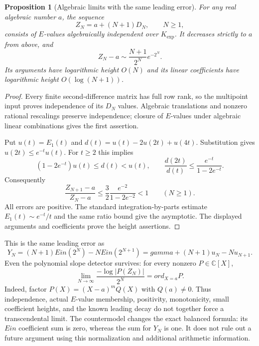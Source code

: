 \documentclass[11pt,a4paper]{article}
\DeclareMathOperator{\Ein}{Ein}
\newtheorem{proposition}[theorem]{Proposition}
\theoremstyle{definition}
\theoremstyle{remark}
\theoremstyle{plain}
\numberwithin{equation}{section}
\def\Ein{Ein}\def\gamma{gamma}\def\delta{delta}\def\eta{eta}%
\def\operatorname#1{#1}\def\mathrm#1{#1}}
\begin{document}
\begin{proposition}[Algebraic limits with the same leading error]\label{em:algebraic-limit-countermodel}
For any real algebraic number $a$, the sequence
\[
 Z_N=a+(N+1)D_N,\qquad N\ge1,
\]
consists of $E$-values algebraically independent over $K_{\exp}$.
It decreases strictly to $a$ from above, and
\[
 Z_N-a\sim\frac{N+1}{2^N}e^{-2^N}.
\]
Its arguments have logarithmic height $O(N)$ and its linear
coefficients have logarithmic height $O(\log(N+1))$.
\end{proposition}
\begin{proof}
Every finite second-difference matrix has full row rank, so the
multipoint input proves independence of its $D_N$ values. Algebraic
translations and nonzero rational rescalings preserve independence;
closure of $E$-values under algebraic linear combinations gives the
first assertion.

Put $u(t)=E_1(t)$ and $d(t)=u(t)-2u(2t)+u(4t)$.
Substitution gives $u(2t)\le e^{-t}u(t)$. For $t\ge2$ this implies
\[
 (1-2e^{-t})u(t)\le d(t)<u(t),\qquad
 \frac{d(2t)}{d(t)}\le\frac{e^{-t}}{1-2e^{-t}}.
\]
Consequently
\[
 \frac{Z_{N+1}-a}{Z_N-a}
 \le\frac32\frac{e^{-2}}{1-2e^{-2}}<1\qquad(N\ge1).
\]
All errors are positive. The standard integration-by-parts estimate
$E_1(t)\sim e^{-t}/t$ and the same ratio bound give the asymptotic.
The displayed arguments and coefficients prove the height assertions.
\end{proof}

This is the same leading error as
\[
 Y_N=(N+1)\Ein(2^N)-N\Ein(2^{N+1})
 =\gamma+(N+1)u_N-Nu_{N+1}.
\]
Even the polynomial slope detector survives: for every nonzero
$P\in\mathbb C[X]$,
\[
 \lim_{N\to\infty}\frac{-\log|P(Z_N)|}{2^N}
 =\operatorname{ord}_{X=a}P.
\]
Indeed, factor $P(X)=(X-a)^mQ(X)$ with $Q(a)\ne0$.
Thus independence, actual $E$-value membership, positivity, monotonicity,
small coefficient heights, and the known leading decay do not together
force a transcendental limit. The countermodel changes the exact balanced
formula: its $\Ein$ coefficient sum is zero, whereas the sum for $Y_N$
is one. It does not rule out a future argument using this normalization
and additional arithmetic information.
\end{document}
